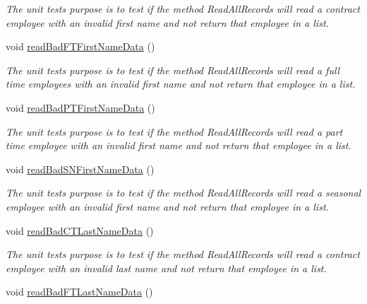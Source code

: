 \begin{DoxyCompactItemize}
\begin{DoxyCompactList}\small\item\em The unit test\textquotesingle{}s purpose is to test if the method Read\+All\+Records will read a contract employee with an invalid first name and not return that employee in a list. \end{DoxyCompactList}\item 
void \hyperlink{class_file_i_o_tests_1_1_file_i_o_tests_aa64a71c55fc17508c8551b9e409253aa}{read\+Bad\+F\+T\+First\+Name\+Data} ()
\begin{DoxyCompactList}\small\item\em The unit test\textquotesingle{}s purpose is to test if the method Read\+All\+Records will read a full time employees with an invalid first name and not return that employee in a list. \end{DoxyCompactList}\item 
void \hyperlink{class_file_i_o_tests_1_1_file_i_o_tests_a8c1903b58f09401fa2b43d9f6b4edc2a}{read\+Bad\+P\+T\+First\+Name\+Data} ()
\begin{DoxyCompactList}\small\item\em The unit test\textquotesingle{}s purpose is to test if the method Read\+All\+Records will read a part time employee with an invalid first name and not return that employee in a list. \end{DoxyCompactList}\item 
void \hyperlink{class_file_i_o_tests_1_1_file_i_o_tests_a36342a1b5ca8abbb5d2e7b437b73653f}{read\+Bad\+S\+N\+First\+Name\+Data} ()
\begin{DoxyCompactList}\small\item\em The unit test\textquotesingle{}s purpose is to test if the method Read\+All\+Records will read a seasonal employee with an invalid first name and not return that employee in a list. \end{DoxyCompactList}\item 
void \hyperlink{class_file_i_o_tests_1_1_file_i_o_tests_aabcbda743af2ce41d9e4be026d03a8d1}{read\+Bad\+C\+T\+Last\+Name\+Data} ()
\begin{DoxyCompactList}\small\item\em The unit test\textquotesingle{}s purpose is to test if the method Read\+All\+Records will read a contract employee with an invalid last name and not return that employee in a list. \end{DoxyCompactList}\item 
void \hyperlink{class_file_i_o_tests_1_1_file_i_o_tests_a65a82c433721ab579d47dffefbf27876}{read\+Bad\+F\+T\+Last\+Name\+Data} ()

\end{DoxyCompactItemize}
